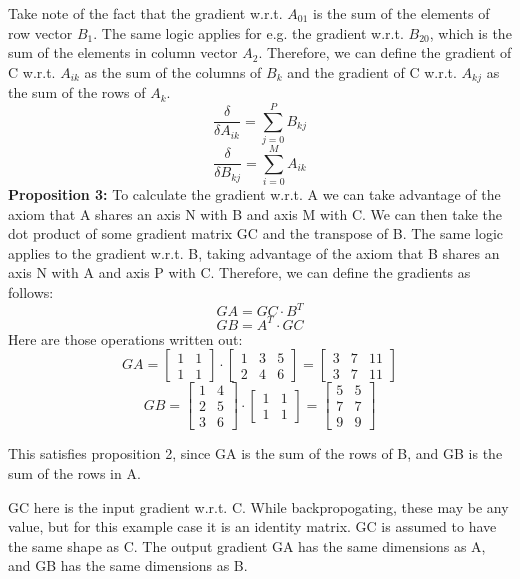 \documentclass{article}
\begin{document}
        Take note of the fact that the gradient w.r.t. $A_{01}$ is the sum of the elements of row vector $B_1$. The same logic applies for e.g. the gradient w.r.t. $B_{20}$, which is the sum of 
        the elements in column vector $A_2$. Therefore, we can define the gradient of C w.r.t. $A_{ik}$ as the sum of the columns of $B_k$ and the gradient of C w.r.t. $A_{kj}$ as the sum of the rows of $A_k$. 
        $$\frac{\delta}{\delta{A_{ik}}} = \sum_{j=0}^{P} B_{kj}$$
        $$\frac{\delta}{\delta{B_{kj}}} = \sum_{i=0}^{M} A_{ik}$$
        \textbf{Proposition 3:}
        To calculate the gradient w.r.t. A we can take advantage of the axiom that A shares an axis N with B and axis M with C.  
        We can then take the dot product of some gradient matrix GC and the transpose of B. The same logic applies to the gradient w.r.t. B, 
        taking advantage of the axiom that B shares an axis N with A and axis P with C. Therefore, we can define the gradients as follows:
        $$GA = GC \cdot B^T$$ 
        $$GB = A^T \cdot GC$$
        Here are those operations written out: 
        $$GA = \begin{bmatrix} 1 & 1 \\ 1 & 1\end{bmatrix} \cdot \begin{bmatrix}1 & 3 & 5 \\ 2 & 4 & 6 \end{bmatrix} = \begin{bmatrix}3 & 7 & 11 \\ 3 & 7 & 11 \end{bmatrix}$$
        $$GB = \begin{bmatrix} 1 & 4 \\ 2 & 5 \\ 3 & 6 \end{bmatrix} \cdot \begin{bmatrix} 1 & 1 \\ 1 & 1 \end{bmatrix} = \begin{bmatrix}5 & 5 \\ 7 & 7 \\ 9 & 9 \end{bmatrix}$$

        This satisfies proposition 2, since GA is the sum of the rows of B, and GB is the sum of the rows in A. 

        GC here is the input gradient w.r.t. C. While backpropogating, these may be any value, but for this example case it is an identity matrix. GC is assumed to have the same shape as C.  
        The output gradient GA has the same dimensions as A, and GB has the same dimensions as B. 
            
\end{document}
